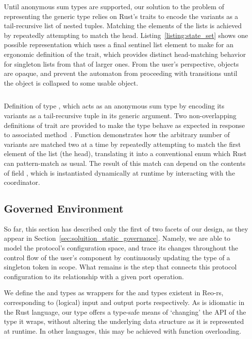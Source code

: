 Until anonymous sum types are supported, our solution to the problem of representing the generic  type relies on Rust's traits to encode the variants as a tail-recursive list of nested tuples. Matching the elements of the lists is achieved by repeatedly attempting to match the head. Listing~\ref{listing:state_set} shows one possible representation which uses a final sentinel list element to make for an ergonomic definition of the  trait, which provides distinct head-matching behavior for singleton lists from that of larger ones. From the user's perspective,  objects are opaque, and prevent the automaton from proceeding with transitions until the object is collapsed to some usable  object.

\begin{listing}[h!]
	\centering
	\inputminted{rust}{state_set.rs}
	\caption[Rust implementation of an arbitrary state set.]{Definition of type , which acts as an anonymous sum type by encoding its variants as a tail-recursive tuple in its generic argument. Two non-overlapping definitions of trait  are provided to make the type behave as expected in response to associated method~. Function  demonstrates how the arbitrary number of variants are matched two at a time by repeatedly attempting to match the first element of the list (the head), translating it into a conventional  enum which Rust can pattern-match as usual. The result of this match can depend on the contents of field , which is instantiated dynamically at runtime by interacting with the coordinator.}
	\label{listing:state_set}
\end{listing}

\subsection{Governed Environment}
So far, this section has described only the first of two facets of our design, as they appear in Section~\ref{sec:soluition_static_governance}. Namely, we are able to model the protocol's configuration space, and trace its changes throughout the control flow of the user's component by continuously updating the type of a singleton token in scope. What remains is the step that connects this protocol configuration to its relationship with a given port operation.

We define the  and  types as wrappers for the  and  types existent in Reo-rs, corresponding to (logical) input and output ports respectively. As is idiomatic in the Rust language, our  type offers a type-safe means of `changing' the API of the type it wraps, without altering the underlying data structure as it is represented at runtime. In other languages, this may be achieved with function overloading.

